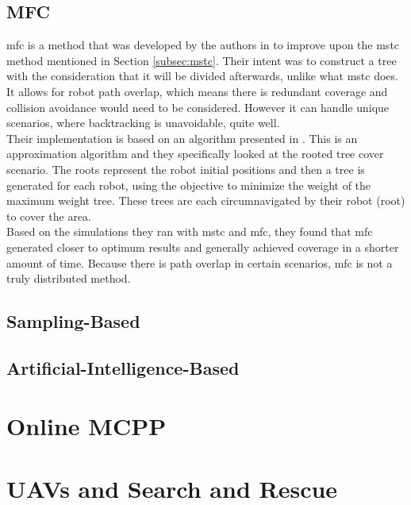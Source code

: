 \subsection{MFC}
\acf{mfc} is a method that was developed by the authors in \cite{Zheng2005} to improve upon the \acs{mstc} method mentioned in Section \ref{subsec:mstc}. Their intent was to construct a tree with the consideration that it will be divided afterwards, unlike what \acs{mstc} does. It allows for robot path overlap, which means there is redundant coverage and collision avoidance would need to be considered. However it can handle unique scenarios, where backtracking is unavoidable, quite well.\\ 
Their implementation is based on an algorithm presented in \cite{Even2003}. This is an approximation algorithm and they specifically looked at the rooted tree cover scenario. The roots represent the robot initial positions and then a tree is generated for each robot, using the objective to minimize the weight of the maximum weight tree. These trees are each circumnavigated by their robot (root) to cover the area.\\
Based on the simulations they ran with \acs{mstc} and \acs{mfc}, they found that \acs{mfc} generated closer to optimum results and generally achieved coverage in a shorter amount of time.	Because there is path overlap in certain scenarios, \acs{mfc} is not a truly distributed method.
\subsection{Sampling-Based}
\subsection{Artificial-Intelligence-Based}

\section{Online MCPP}
\label{sec:lit Online MCPP}
\section{UAVs and Search and Rescue}


